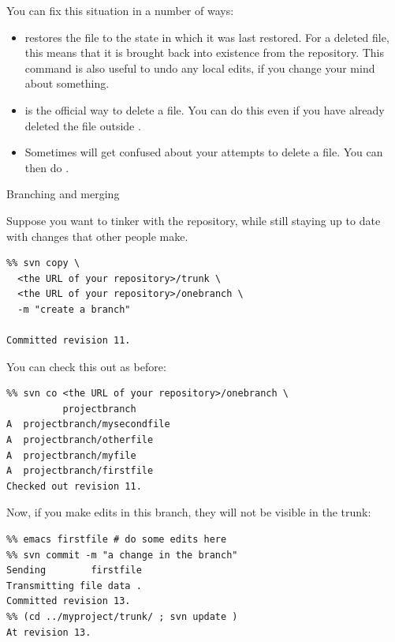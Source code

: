 You can fix this situation in a number of ways:
\begin{itemize}
\item {} restores the file to the state in which it was
  last restored. For a deleted file, this means that it is brought
  back into existence from the repository. This command is also useful to
  undo any local edits, if you change your mind about something.
\item {} is the official way to delete a file. You
  can do this even if you have already deleted the file outside
  .
\item Sometimes  will get confused about your attempts to
  delete a file. You can then do .
\end{itemize}

 {Branching and merging}

Suppose you want to tinker with the repository, while still staying up
to date with changes that other people make.
\begin{verbatim}
%% svn copy \
  <the URL of your repository>/trunk \
  <the URL of your repository>/onebranch \
  -m "create a branch"

Committed revision 11.
\end{verbatim}
You can check this out as before:
\begin{verbatim}
%% svn co <the URL of your repository>/onebranch \
          projectbranch       
A  projectbranch/mysecondfile
A  projectbranch/otherfile
A  projectbranch/myfile
A  projectbranch/firstfile
Checked out revision 11.
\end{verbatim}

Now, if you make edits in this branch, they will not be visible in the
trunk:
\begin{verbatim}
%% emacs firstfile # do some edits here
%% svn commit -m "a change in the branch"
Sending        firstfile
Transmitting file data .
Committed revision 13.
%% (cd ../myproject/trunk/ ; svn update )
At revision 13.
\end{verbatim}

